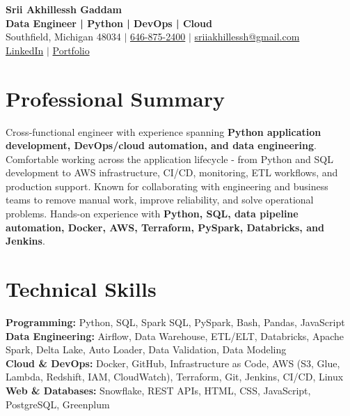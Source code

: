 \documentclass[letterpaper,10pt]{article}
\begin{document}
\fontsize{9.35pt}{10.45pt}\selectfont

\begin{center}
    {\LARGE \textbf{Srii Akhillessh Gaddam}} \\[-1pt]
    \textbf{Data Engineer | Python | DevOps | Cloud} \\[2pt]
    Southfield, Michigan 48034 $|$
    \href{tel:6468752400}{646-875-2400} $|$
    \href{mailto:sriiakhillessh@gmail.com}{sriiakhillessh@gmail.com} \\[1pt]
    \href{https://www.linkedin.com/in/srii-akhiilessh-gaddam-b48668191/}{LinkedIn} $|$
    \href{https://sriiakhillesshg.github.io/portfolio/}{Portfolio}
\end{center}
\vspace{-8pt}

\section{Professional Summary}
\small{Cross-functional engineer with experience spanning \textbf{Python application development, DevOps/cloud automation, and data engineering}. Comfortable working across the application lifecycle - from Python and SQL development to AWS infrastructure, CI/CD, monitoring, ETL workflows, and production support. Known for collaborating with engineering and business teams to remove manual work, improve reliability, and solve operational problems. Hands-on experience with \textbf{Python, SQL, data pipeline automation, Docker, AWS, Terraform, PySpark, Databricks, and Jenkins}.}

\section{Technical Skills}
\small{
\textbf{Programming:} Python, SQL, Spark SQL, PySpark, Bash, Pandas, JavaScript \\
\textbf{Data Engineering:} Airflow, Data Warehouse, ETL/ELT, Databricks, Apache Spark, Delta Lake, Auto Loader, Data Validation, Data Modeling \\
\textbf{Cloud \& DevOps:} Docker, GitHub, Infrastructure as Code, AWS (S3, Glue, Lambda, Redshift, IAM, CloudWatch), Terraform, Git, Jenkins, CI/CD, Linux \\
\textbf{Web \& Databases:} Snowflake, REST APIs, HTML, CSS, JavaScript, PostgreSQL, Greenplum
}
\end{document}
